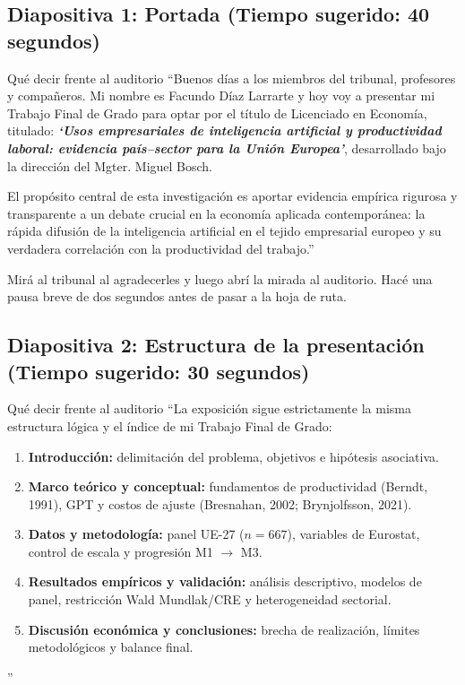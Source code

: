 \documentclass[11pt,a4paper]{article}
\begin{document}
\vspace{0.4cm}

\subsection*{Diapositiva 1: Portada (Tiempo sugerido: 40 segundos)}

\begin{speechbox}{Qué decir frente al auditorio}
``Buenos días a los miembros del tribunal, profesores y compañeros. Mi nombre es Facundo Díaz Larrarte y hoy voy a presentar mi Trabajo Final de Grado para optar por el título de Licenciado en Economía, titulado: \textbf{\textit{`Usos empresariales de inteligencia artificial y productividad laboral: evidencia país--sector para la Unión Europea'}}, desarrollado bajo la dirección del Mgter. Miguel Bosch.

El propósito central de esta investigación es aportar evidencia empírica rigurosa y transparente a un debate crucial en la economía aplicada contemporánea: la rápida difusión de la inteligencia artificial en el tejido empresarial europeo y su verdadera correlación con la productividad del trabajo.''
\end{speechbox}

\begin{tipbox}
Mirá al tribunal al agradecerles y luego abrí la mirada al auditorio. Hacé una pausa breve de dos segundos antes de pasar a la hoja de ruta.
\end{tipbox}

\subsection*{Diapositiva 2: Estructura de la presentación (Tiempo sugerido: 30 segundos)}

\begin{speechbox}{Qué decir frente al auditorio}
``La exposición sigue estrictamente la misma estructura lógica y el índice de mi Trabajo Final de Grado:
\begin{enumerate}[itemsep=0.1em]
  \item \textbf{Introducción:} delimitación del problema, objetivos e hipótesis asociativa.
  \item \textbf{Marco teórico y conceptual:} fundamentos de productividad (Berndt, 1991), GPT y costos de ajuste (Bresnahan, 2002; Brynjolfsson, 2021).
  \item \textbf{Datos y metodología:} panel UE-27 ($n=667$), variables de Eurostat, control de escala y progresión M1 $\rightarrow$ M3.
  \item \textbf{Resultados empíricos y validación:} análisis descriptivo, modelos de panel, restricción Wald Mundlak/CRE y heterogeneidad sectorial.
  \item \textbf{Discusión económica y conclusiones:} brecha de realización, límites metodológicos y balance final.
\end{enumerate}''
\end{speechbox}
\end{document}
